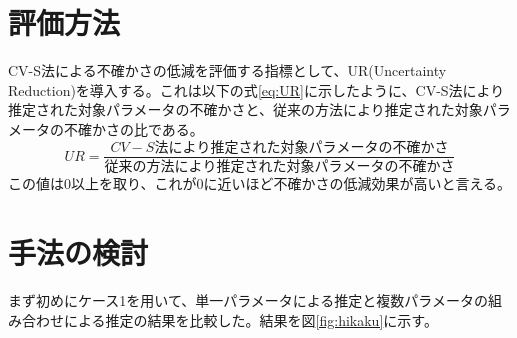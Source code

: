 \documentclass[a4paper,11pt,titlepage,uplatex]{jsreport}
\begin{document}
\section{評価方法}
CV-S法による不確かさの低減を評価する指標として、UR(Uncertainty Reduction)を導入する。これは以下の式\ref{eq:UR}に示したように、CV-S法により推定された対象パラメータの不確かさと、従来の方法により推定された対象パラメータの不確かさの比である。
\begin{equation}
  UR = \frac{CV-S法により推定された対象パラメータの不確かさ}{従来の方法により推定された対象パラメータの不確かさ}
  \label{eq:UR}
\end{equation}
この値は0以上を取り、これが0に近いほど不確かさの低減効果が高いと言える。

\section{手法の検討}
まず初めにケース1を用いて、単一パラメータによる推定と複数パラメータの組み合わせによる推定の結果を比較した。結果を図\ref{fig:hikaku}に示す。
\end{document}

